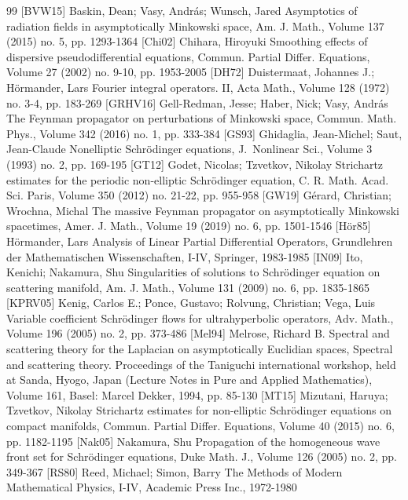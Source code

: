 \begin{thebibliography}{99}
 [BVW15] Baskin, Dean; Vasy, András; Wunsch, Jared Asymptotics of radiation fields in asymptotically Minkowski space, Am. J. Math., Volume 137 (2015) no. 5, pp. 1293-1364
 [Chi02] Chihara, Hiroyuki Smoothing effects of dispersive pseudodifferential equations, Commun. Partial Differ. Equations, Volume 27 (2002) no. 9-10, pp. 1953-2005
 [DH72] Duistermaat, Johannes J.; Hörmander, Lars Fourier integral operators. II, Acta Math., Volume 128 (1972) no. 3-4, pp. 183-269
 [GRHV16] Gell-Redman, Jesse; Haber, Nick; Vasy, András The Feynman propagator on perturbations of Minkowski space, Commun. Math. Phys., Volume 342 (2016) no. 1, pp. 333-384
 [GS93] Ghidaglia, Jean-Michel; Saut, Jean-Claude Nonelliptic Schrödinger equations, J. Nonlinear Sci., Volume 3 (1993) no. 2, pp. 169-195
 [GT12] Godet, Nicolas; Tzvetkov, Nikolay Strichartz estimates for the periodic non-elliptic Schrödinger equation, C. R. Math. Acad. Sci. Paris, Volume 350 (2012) no. 21-22, pp. 955-958
 [GW19] Gérard, Christian; Wrochna, Michal The massive Feynman propagator on asymptotically Minkowski spacetimes, Amer. J. Math., Volume 19 (2019) no. 6, pp. 1501-1546
 [Hör85] Hörmander, Lars Analysis of Linear Partial Differential Operators, Grundlehren der Mathematischen Wissenschaften, I-IV, Springer, 1983-1985
 [IN09] Ito, Kenichi; Nakamura, Shu Singularities of solutions to Schrödinger equation on scattering manifold, Am. J. Math., Volume 131 (2009) no. 6, pp. 1835-1865
 [KPRV05] Kenig, Carlos E.; Ponce, Gustavo; Rolvung, Christian; Vega, Luis Variable coefficient Schrödinger flows for ultrahyperbolic operators, Adv. Math., Volume 196 (2005) no. 2, pp. 373-486
 [Mel94] Melrose, Richard B. Spectral and scattering theory for the Laplacian on asymptotically Euclidian spaces, Spectral and scattering theory. Proceedings of the Taniguchi international workshop, held at Sanda, Hyogo, Japan (Lecture Notes in Pure and Applied Mathematics), Volume 161, Basel: Marcel Dekker, 1994, pp. 85-130
 [MT15] Mizutani, Haruya; Tzvetkov, Nikolay Strichartz estimates for non-elliptic Schrödinger equations on compact manifolds, Commun. Partial Differ. Equations, Volume 40 (2015) no. 6, pp. 1182-1195
 [Nak05] Nakamura, Shu Propagation of the homogeneous wave front set for Schrödinger equations, Duke Math. J., Volume 126 (2005) no. 2, pp. 349-367
 [RS80] Reed, Michael; Simon, Barry The Methods of Modern Mathematical Physics, I-IV, Academic Press Inc., 1972-1980

\end{thebibliography}
